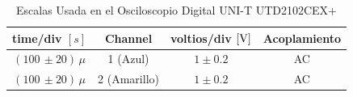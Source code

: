             \begin{table}[H]
                \centering
                \begin{tabular}{|c|c|c|c|}
                    \hline
                    \textbf{time/div} $[s]$ & \textbf{Channel} & \textbf{voltios/div $[\volt]$} & \textbf{Acoplamiento} \\ \hline
                    $(100 \, \pm 20) \, \mu  $ & 1 (Azul)  &   $1 \pm 0.2   $ & AC \\ \hline  
                    $(100 \, \pm 20) \, \mu  $ & 2 (Amarillo)  &   $1 \pm 0.2   $ & AC \\ \hline  
                \end{tabular}
                \caption{Escalas Usada en el Osciloscopio Digital UNI-T UTD2102CEX+}
                \label{tab:escala_gf2}
            \end{table}
        


      

    
\newpage
